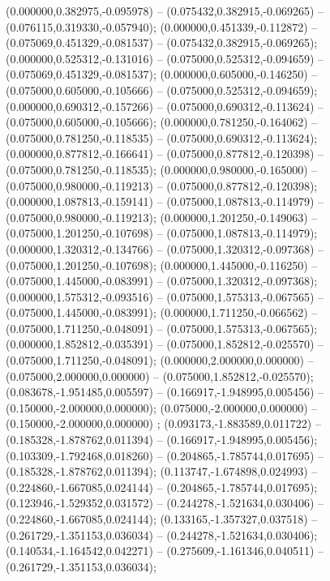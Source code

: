  (0.000000,0.382975,-0.095978) -- (0.075432,0.382915,-0.069265) -- (0.076115,0.319330,-0.057940);
 (0.000000,0.451339,-0.112872) -- (0.075069,0.451329,-0.081537) -- (0.075432,0.382915,-0.069265);
 (0.000000,0.525312,-0.131016) -- (0.075000,0.525312,-0.094659) -- (0.075069,0.451329,-0.081537);
 (0.000000,0.605000,-0.146250) -- (0.075000,0.605000,-0.105666) -- (0.075000,0.525312,-0.094659);
 (0.000000,0.690312,-0.157266) -- (0.075000,0.690312,-0.113624) -- (0.075000,0.605000,-0.105666);
 (0.000000,0.781250,-0.164062) -- (0.075000,0.781250,-0.118535) -- (0.075000,0.690312,-0.113624);
 (0.000000,0.877812,-0.166641) -- (0.075000,0.877812,-0.120398) -- (0.075000,0.781250,-0.118535);
 (0.000000,0.980000,-0.165000) -- (0.075000,0.980000,-0.119213) -- (0.075000,0.877812,-0.120398);
 (0.000000,1.087813,-0.159141) -- (0.075000,1.087813,-0.114979) -- (0.075000,0.980000,-0.119213);
 (0.000000,1.201250,-0.149063) -- (0.075000,1.201250,-0.107698) -- (0.075000,1.087813,-0.114979);
 (0.000000,1.320312,-0.134766) -- (0.075000,1.320312,-0.097368) -- (0.075000,1.201250,-0.107698);
 (0.000000,1.445000,-0.116250) -- (0.075000,1.445000,-0.083991) -- (0.075000,1.320312,-0.097368);
 (0.000000,1.575312,-0.093516) -- (0.075000,1.575313,-0.067565) -- (0.075000,1.445000,-0.083991);
 (0.000000,1.711250,-0.066562) -- (0.075000,1.711250,-0.048091) -- (0.075000,1.575313,-0.067565);
 (0.000000,1.852812,-0.035391) -- (0.075000,1.852812,-0.025570) -- (0.075000,1.711250,-0.048091);
 (0.000000,2.000000,0.000000) -- (0.075000,2.000000,0.000000) -- (0.075000,1.852812,-0.025570);
 (0.083678,-1.951485,0.005597) -- (0.166917,-1.948995,0.005456) -- (0.150000,-2.000000,0.000000);
 (0.075000,-2.000000,0.000000) -- (0.150000,-2.000000,0.000000) ;
 (0.093173,-1.883589,0.011722) -- (0.185328,-1.878762,0.011394) -- (0.166917,-1.948995,0.005456);
 (0.103309,-1.792468,0.018260) -- (0.204865,-1.785744,0.017695) -- (0.185328,-1.878762,0.011394);
 (0.113747,-1.674898,0.024993) -- (0.224860,-1.667085,0.024144) -- (0.204865,-1.785744,0.017695);
 (0.123946,-1.529352,0.031572) -- (0.244278,-1.521634,0.030406) -- (0.224860,-1.667085,0.024144);
 (0.133165,-1.357327,0.037518) -- (0.261729,-1.351153,0.036034) -- (0.244278,-1.521634,0.030406);
 (0.140534,-1.164542,0.042271) -- (0.275609,-1.161346,0.040511) -- (0.261729,-1.351153,0.036034);
